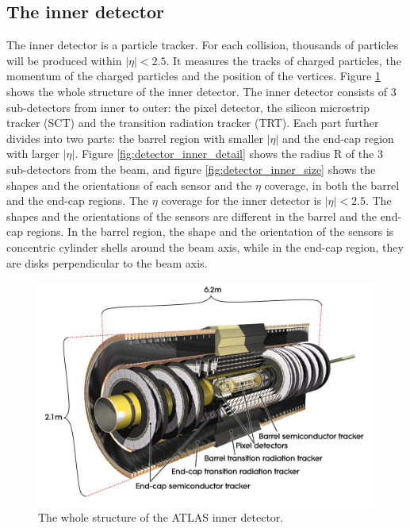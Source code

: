 \subsection{The inner detector}
The inner detector is a particle tracker.
For each collision, thousands of particles will be produced within $|\eta| < 2.5$.
It measures the tracks of charged particles, the momentum of the charged particles and the position of the vertices.
Figure \ref{fig:detector_inner_whole} shows the whole structure of the inner detector.
The inner detector consists of 3 sub-detectors from inner to outer: the pixel detector, the silicon microstrip tracker (SCT) and the transition radiation tracker (TRT).
Each part further divides into two parts: the barrel region with smaller $|\eta|$ and the end-cap region with larger $|\eta|$.
Figure \ref{fig:detector_inner_detail} shows the radius R of the 3 sub-detectors from the beam, and figure \ref{fig:detector_inner_size} shows the shapes and the orientations of each sensor and the $\eta$ coverage, in both the barrel and the end-cap regions.
The $\eta$ coverage for the inner detector is $|\eta| < 2.5$.
The shapes and the orientations of the sensors are different in the barrel and the end-cap regions.
In the barrel region, the shape and the orientation of the sensors is concentric cylinder shells around the beam axis, while in the end-cap region, they are disks perpendicular to the beam axis.
\begin{figure}
\centering
\includegraphics[width=\textwidth]{data/photo/detector/inner_whole.jpg}
\caption{The whole structure of the ATLAS inner detector. \cite{inner_photo}}
\label{fig:detector_inner_whole}
\end{figure}
